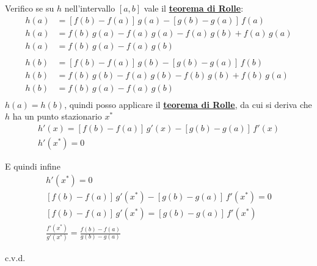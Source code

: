 \documentclass[../../dimostrazioni]{subfiles}
\begin{document}
            Verifico se su \(h\) nell'intervallo \([a,b]\) vale il \textbf{\hyperref[teoRolle]{teorema di Rolle}}:
            \begin{align*}
                h(a)&=\left[f(b) - f(a)\right] \, g(a) - \left[g(b) - g(a)\right] \, f(a)\\
                h(a)&=f(b) \, g(a) - f(a) \, g(a) - f(a) \, g(b) + f(a) \, g(a)\\
                h(a)&=f(b) \, g(a) - f(a) \, g(b)\\
                \\
                h(b)&=\left[f(b) - f(a)\right] \, g(b) - \left[g(b) - g(a)\right] \, f(b)\\
                h(b)&=f(b) \, g(b) - f(a) \, g(b) - f(b) \, g(b) + f(b) \, g(a)\\
                h(b)&=f(b) \, g(a) - f(a) \, g(b)\\
            \end{align*}
            \(h(a)=h(b)\), quindi posso applicare il \textbf{\hyperref[teoRolle]{teorema di Rolle}}, da cui si deriva che \(h\) ha un punto stazionario \(x^*\)
            \begin{gather*}
                h'(x) = \left[f(b) - f(a)\right] \, g'(x) - \left[g(b) - g(a)\right] \, f'(x)\\
                h'(x^*) = 0    
            \end{gather*}

            E quindi infine
            \begin{gather*}
                h'(x^*) = 0\\
            \left[f(b) - f(a)\right] \, g'(x^*) - \left[g(b) - g(a)\right] \, f'(x^*) = 0\\
            \left[f(b) - f(a)\right] \, g'(x^*) = \left[g(b) - g(a)\right] \, f'(x^*)\\
            \frac{ f'(x^*) }{ g'(x^*) } = \frac{ f(b) - f(a) }{ g(b) - g(a) }
            \end{gather*}
            
            c.v.d.
\end{document}

